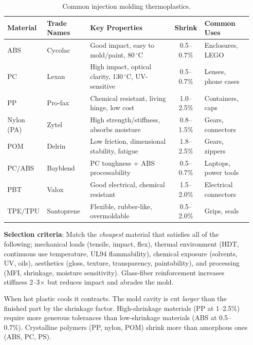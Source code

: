\documentclass[11pt,letterpaper,twoside,openany]{book}
\newcommand{\degC}{\ensuremath{{}^{\circ}\text{C}}}
\begin{document}
\begin{table}[htbp]
\centering\small
\begin{tabularx}{\textwidth}{l l X c l}
  \toprule
  \textbf{Material} & \textbf{Trade Names} & \textbf{Key Properties} & \textbf{Shrink} & \textbf{Common Uses} \\
  \midrule
  ABS & Cycolac & Good impact, easy to mold/paint, 80\,\degC & 0.5--0.7\% & Enclosures, LEGO \\
  PC & Lexan & High impact, optical clarity, 130\,\degC, UV-sensitive & 0.5--0.7\% & Lenses, phone cases \\
  PP & Pro-fax & Chemical resistant, living hinge, low cost & 1.0--2.5\% & Containers, caps \\
  Nylon (PA) & Zytel & High strength/stiffness, absorbs moisture & 0.8--1.5\% & Gears, connectors \\
  POM & Delrin & Low friction, dimensional stability, fatigue & 1.8--2.5\% & Gears, zippers \\
  PC/ABS & Bayblend & PC toughness + ABS processability & 0.5--0.7\% & Laptops, power tools \\
  PBT & Valox & Good electrical, chemical resistant & 1.5--2.0\% & Electrical connectors \\
  TPE/TPU & Santoprene & Flexible, rubber-like, overmoldable & 0.5--2.0\% & Grips, seals \\
  \bottomrule
\end{tabularx}
\caption{Common injection molding thermoplastics.}
\end{table}

\textbf{Selection criteria}: Match the \emph{cheapest} material that satisfies all of the following; mechanical loads (tensile, impact, flex), thermal environment (HDT, continuous use temperature, UL94 flammability), chemical exposure (solvents, UV, oils), aesthetics (gloss, texture, transparency, paintability), and processing (MFI, shrinkage, moisture sensitivity). Glass-fiber reinforcement increases stiffness 2--3$\times$ but reduces impact and abrades the mold.

\begin{tipbox}
When hot plastic cools it contracts. The mold cavity is cut \emph{larger} than the finished part by the shrinkage factor. High-shrinkage materials (PP at 1--2.5\%) require more generous tolerances than low-shrinkage materials (ABS at 0.5--0.7\%). Crystalline polymers (PP, nylon, POM) shrink more than amorphous ones (ABS, PC, PS).
\end{tipbox}
\end{document}
